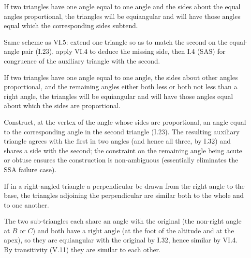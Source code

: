 \begin{claim}
\label{prop:VI.6}
If two triangles have one angle equal to one angle and the sides
about the equal angles proportional, the triangles will be
equiangular and will have those angles equal which the corresponding
sides subtend.
\end{claim}
\begin{evidence}[Proof of VI.6]
\label{ev:VI.6}
Same scheme as VI.5: extend one triangle so as to match the second
on the equal-angle pair (I.23), apply VI.4 to deduce the missing
side, then I.4 (SAS) for congruence of the auxiliary triangle with
the second.
\end{evidence}

\begin{claim}
\label{prop:VI.7}
If two triangles have one angle equal to one angle, the sides about
other angles proportional, and the remaining angles either both less
or both not less than a right angle, the triangles will be
equiangular and will have those angles equal about which the sides
are proportional.
\end{claim}
\begin{evidence}[Proof of VI.7]
\label{ev:VI.7}
Construct, at the vertex of the angle whose sides are proportional,
an angle equal to the corresponding angle in the second triangle
(I.23).  The resulting auxiliary triangle agrees with the first in
two angles (and hence all three, by I.32) and shares a side with the
second; the constraint on the remaining angle being acute or obtuse
ensures the construction is non-ambiguous (essentially eliminates
the SSA failure case).
\end{evidence}

\begin{claim}
\label{prop:VI.8}
If in a right-angled triangle a perpendicular be drawn from the right
angle to the base, the triangles adjoining the perpendicular are
similar both to the whole and to one another.
\end{claim}
\begin{evidence}[Proof of VI.8]
\label{ev:VI.8}
The two sub-triangles each share an angle with the original (the
non-right angle at $B$ or $C$) and both have a right angle (at the
foot of the altitude and at the apex), so they are equiangular with
the original by I.32, hence similar by VI.4.  By transitivity (V.11)
they are similar to each other.
\end{evidence}

